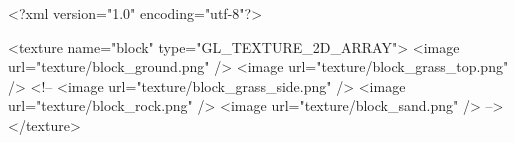 <?xml version="1.0" encoding="utf-8"?>

<texture name="block" type="GL_TEXTURE_2D_ARRAY">
  <image url="texture/block_ground.png" />
  <image url="texture/block_grass_top.png" />
  <!--
  <image url="texture/block_grass_side.png" />
  <image url="texture/block_rock.png" />
  <image url="texture/block_sand.png" />
  -->
</texture>

